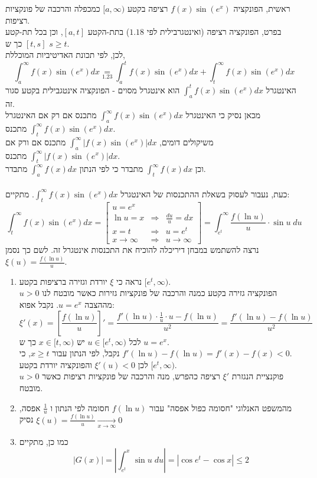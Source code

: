 \documentclass{article}
\newcommand\underrel[2]{\mathrel{\mathop{#2}\limits_{#1}}}
\begin{document}
ראשית, הפונקציה
$f(x)\sin(e^x)$
רציפה בקטע $[a,\infty)$
כמכפלה והרכבה של פונקציות רציפות. \\
בפרט, הפונקציה רציפה (ואינטגרבילית לפי $1.18$) בתת-הקטע
$[a,t]$, וכן בכל תת-קטע $[t,s]$ כך ש $s \geq t$. \\
לכן, לפי תכונת האדיטיביות המוכללת,
\[
    \int_a^\infty f(x)\sin(e^x)dx \underrel{1.23}{=}
    \int_a^t f(x)\sin(e^x)dx + \int_t^\infty f(x)\sin(e^x)dx
\]
האינטגרל $\int_a^t f(x)\sin(e^x)dx$
הוא אינטגרל מסוים - הפונקציה אינטגבילית בקטע סגור זה. \\
מכאן נסיק כי האינטגרל $\int_a^\infty f(x)\sin(e^x)dx$
מתכנס אם רק אם האינטגרל $\int_t^\infty f(x)\sin(e^x)dx$ מתכנס. \\
משיקולים דומים, $\int_a^\infty |f(x)\sin(e^x)|dx$ מתכנס אם ורק אם $\int_t^\infty |f(x)\sin(e^x)|dx$ מתכנס. \\
וכן $\int_t^\infty f(x)dx$ מתבדר כי לפי הנתון $\int_a^\infty f(x)dx$ מתבדר.
\\\\
כעת, נעבור לעסוק בשאלת ההתכנסות של האינטגרל $\int_t^\infty f(x)\sin(e^x)dx$.
מתקיים:
\[
    \int_t^\infty f(x)\sin(e^x)dx =
    \begin{bmatrix}
        u=e^x                                                    \\
        \ln u = x           & \Rightarrow & \frac{du}{u} = dx    \\
        x = t               & \Rightarrow & u = e^t              \\
        x\rightarrow \infty & \Rightarrow & u \rightarrow \infty
    \end{bmatrix} =
    \int_{e^t}^\infty \frac{f(\ln u)}{u} \cdot \sin u \;du
\]
נרצה להשתמש במבחן דיריכלה להוכיח את התכנסות אינטגרל זה. לשם כך נסמן $\xi(u) = \frac{f(\ln u)}{u}$.
\begin{enumerate}[I]
    \item נראה כי $\xi$ יורדת וגזירה ברציפות בקטע $[e^t, \infty)$. \\
          הפונקציה גזירה בקטע כמנה והרכבה של פונקציות גזירות כאשר מובטח לנו $u>0$ מההצבה $u=e^x$. נקבל אפוא:
          \[
              \xi'(x) = [\frac{f(\ln u)}{u}]' =
              \frac{f'(\ln u)\cdot \frac{1}{u} \cdot u - f(\ln u)}{u^2} =
              \frac{f'(\ln u) - f(\ln u)}{u^2}
          \]
          לכל $u\in[e^t, \infty)$ יש $x\in [t,\infty)$ כך ש $u=e^x$. \\
          נקבל, לפי הנתון עבור $x\geq t$, כי $f'(\ln u)-f(\ln u)=f'(x)-f(x)<0$. \\
          לכן $\xi'(u)<0$ והפונקציה יורדת בקטע $[e^t, \infty)$. \\
          פוקנציית הנגזרת $\xi'$ רציפה כהפרש, מנה והרכבה של פונקציות רציפות כאשר $u>0$ מובטח.
    \item מהמשפט האנלוגי "חסומה כפול אפסה" עבור $f(\ln u)$ חסומה לפי הנתון ו $\frac{1}{u}$ אפסה,
          נסיק $\xi(u)=\frac{f(\ln u)}{u}\xrightarrow[x\rightarrow \infty]{}0$
    \item כמו כן, מתקיים
          \[
              |G(x)| = |\int_{e^t}^x \sin u \; du| = |\cos e^t - \cos x| \leq 2
          \]
\end{enumerate}
\end{document}
